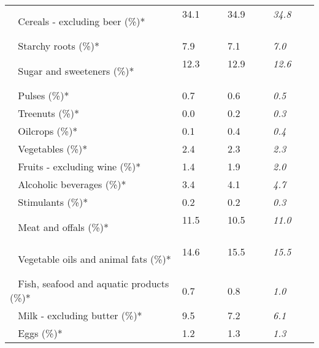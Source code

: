 \begin{tabular}{L{3.9cm} R{1cm} R{1cm} R{1cm}}
	 ~ Cereals - excluding beer (\%)* & 34.1 ~ \ \ & 34.9 ~ \ \ & \textit{34.8} ~ \ \ \\ 
	 ~ Starchy roots (\%)* & 7.9 ~ \ \ & 7.1 ~ \ \ & \textit{7.0} ~ \ \ \\ 
	 ~ Sugar and sweeteners (\%)* & 12.3 ~ \ \ & 12.9 ~ \ \ & \textit{12.6} ~ \ \ \\ 
	 ~ Pulses (\%)* & 0.7 ~ \ \ & 0.6 ~ \ \ & \textit{0.5} ~ \ \ \\ 
	 ~ Treenuts (\%)* & 0.0 ~ \ \ & 0.2 ~ \ \ & \textit{0.3} ~ \ \ \\ 
	 ~ Oilcrops (\%)* & 0.1 ~ \ \ & 0.4 ~ \ \ & \textit{0.4} ~ \ \ \\ 
	 ~ Vegetables (\%)* & 2.4 ~ \ \ & 2.3 ~ \ \ & \textit{2.3} ~ \ \ \\ 
	 ~ Fruits - excluding wine (\%)* & 1.4 ~ \ \ & 1.9 ~ \ \ & \textit{2.0} ~ \ \ \\ 
	 ~ Alcoholic beverages (\%)* & 3.4 ~ \ \ & 4.1 ~ \ \ & \textit{4.7} ~ \ \ \\ 
	 ~ Stimulants (\%)* & 0.2 ~ \ \ & 0.2 ~ \ \ & \textit{0.3} ~ \ \ \\ 
	 ~ Meat and offals (\%)* & 11.5 ~ \ \ & 10.5 ~ \ \ & \textit{11.0} ~ \ \ \\ 
	 ~ Vegetable oils and animal fats (\%)* & 14.6 ~ \ \ & 15.5 ~ \ \ & \textit{15.5} ~ \ \ \\ 
	 ~ Fish, seafood and aquatic products (\%)* & 0.7 ~ \ \ & 0.8 ~ \ \ & \textit{1.0} ~ \ \ \\ 
	 ~ Milk - excluding butter (\%)* & 9.5 ~ \ \ & 7.2 ~ \ \ & \textit{6.1} ~ \ \ \\ 
	 ~ Eggs (\%)* & 1.2 ~ \ \ & 1.3 ~ \ \ & \textit{1.3} ~ \ \ \\ 
       \toprule
      \end{tabular}
      \clearpage
{}
